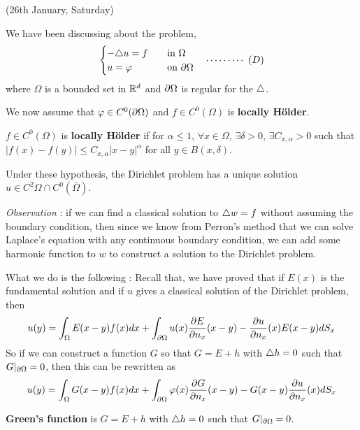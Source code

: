 \documentclass[12pt,a4paper]{article}
\begin{document}
\newday

(26th January, Saturday)
\s

We have been discussing about the problem,
\begin{align*}
\begin{cases}
-\triangle u =f \quad &\text{in }\Omega \\
u=\varphi \quad &\text{on } \partial \Omega
\end{cases} \quad \cdots\cdots\cdots\,\,(D)
\end{align*}
where $\Omega$ is a bounded set in $\mathbb{R}^d$ and $\partial \Omega$ is regular for the $\triangle$.
\s

We now assume that $\varphi \in C^0(\partial \Omega)$ and $f\in C^0(\Omega)$ is \textbf{locally H\"older}.
\s

 $f\in C^0(\Omega)$ is \textbf{locally H\"older} if for $\alpha\leq 1$, $\forall x\in \Omega$, $\exists\delta>0$, $\exists C_{x,\alpha}>0$ such that $|f(x)-f(y)|\leq C_{x,\alpha} |x-y|^{\alpha}$ for all $y\in B(x,\delta)$.
\s

 Under these hypothesis, the Dirichlet problem has a unique solution $u\in C^2{\Omega} \cap C^0(\bar{\Omega})$.
\s

\emph{Observation} : if we can find a classical solution to $\triangle w = f$ without assuming the boundary condition, then since we know from Perron's method that we can solve Laplace's equation with any continuous boundary condition, we can add some harmonic function to $w$ to construct a solution to the Dirichlet problem.
\s

What we do is the following : Recall that, we have proved that if $E(x)$ is the fundamental solution and if $u$ gives a classical solution of the Dirichlet problem, then
\begin{align*}
u(y)= \int_{\Omega} E(x-y) f(x)dx + \int_{\partial \Omega} u(x)\frac{\partial E}{\partial n_x} (x-y) - \frac{\partial u}{\partial n_x}(x) E(x-y) dS_x
\end{align*}
So if we can construct a function $G$ so that $G = E +h$ with $\triangle h =0$ such that $G|_{\partial \Omega} =0$, then this can be rewritten as
\begin{align*}
u(y) = \int_{\Omega} G(x-y) f(x) dx + \int_{\partial \Omega} \varphi(x) \frac{\partial G}{\partial n_x}(x-y) - G(x-y) \frac{\partial u}{\partial n_x}(x) dS_x
\end{align*}
\s

 \textbf{Green's function} is $G = E +h$ with $\triangle h =0$ such that $G|_{\partial \Omega} =0$.
\s
\end{document}

